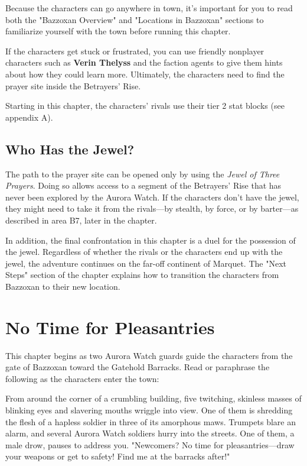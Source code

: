 \documentclass[10pt,a4paper,twoside,fancy,bg=print,twocolumn,openany,nodeprecatedcode]{dndbook}
\begin{document}
Because the characters can go anywhere in town, it's important for you to read both the "Bazzoxan Overview" and "Locations in Bazzoxan" sections to familiarize yourself with the town before running this chapter.

If the characters get stuck or frustrated, you can use friendly nonplayer characters such as \textbf{Verin Thelyss} and the faction agents to give them hints about how they could learn more. Ultimately, the characters need to find the prayer site inside the Betrayers' Rise.

Starting in this chapter, the characters' rivals use their tier 2 stat blocks (see appendix A).

\subsection{Who Has the Jewel?}
The path to the prayer site can be opened only by using the \textit{Jewel of Three Prayers}. Doing so allows access to a segment of the Betrayers' Rise that has never been explored by the Aurora Watch. If the characters don't have the jewel, they might need to take it from the rivals—by stealth, by force, or by barter—as described in area B7, later in the chapter.

In addition, the final confrontation in this chapter is a duel for the possession of the jewel. Regardless of whether the rivals or the characters end up with the jewel, the adventure continues on the far-off continent of Marquet. The "Next Steps" section of the chapter explains how to transition the characters from Bazzoxan to their new location.

\section{No Time for Pleasantries}
This chapter begins as two Aurora Watch guards guide the characters from the gate of Bazzoxan toward the Gatehold Barracks. Read or paraphrase the following as the characters enter the town:

\begin{DndReadAloud}{}
From around the corner of a crumbling building, five twitching, skinless masses of blinking eyes and slavering mouths wriggle into view. One of them is shredding the flesh of a hapless soldier in three of its amorphous maws. Trumpets blare an alarm, and several Aurora Watch soldiers hurry into the streets. One of them, a male drow, pauses to address you. "Newcomers? No time for pleasantries—draw your weapons or get to safety! Find me at the barracks after!"

\end{DndReadAloud}
\end{document}
